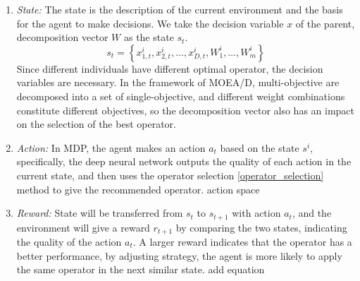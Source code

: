 \documentclass[journal]{IEEEtran}
\newcommand{\TODO}[1]{\textcolor[rgb]{1.00,0.40,0.22}{#1}}
\begin{document}
\begin{enumerate}
  \item \textit{State:}
        The state is the description of the current environment and the basis for the agent to make decisions. We take the decision variable $x$ of the parent, decomposition vector $W$ as the state $s_t$.
        \begin{equation}
          s_{t}=\left\{x_{1,t}^i, x_{2,t}^i, \ldots, x_{D,t}^i, W_{1}^{i}, \ldots, W_{m}^{i}\right\}
        \end{equation}
        Since different individuals have different optimal operator, the decision variables are necessary. In the framework of MOEA/D, multi-objective are decomposed into a set of single-objective, and different weight combinations constitute different objectives, so the decomposition vector also has an impact on the selection of the best operator.
  \item \textit{Action:}
        In MDP, the agent makes an action $a_t$ based on the state $s^i$, specifically, the deep neural network outputs the quality of each action in the current state, and then uses the operator selection \ref{operator_selection} method to give the recommended operator.
        \TODO{action space}
  \item \textit{Reward:}
        State will be transferred from $s_{t}$ to $s_{t+1}$ with action $a_t$, and the environment will give a reward $r_{t+1}$ by comparing the two states, indicating the quality of the action $a_t$. A larger reward indicates that the operator has a better performance, by adjusting strategy, the agent is more likely to apply the same operator in the next similar state.
        \TODO{add equation}
\end{enumerate}
\end{document}
